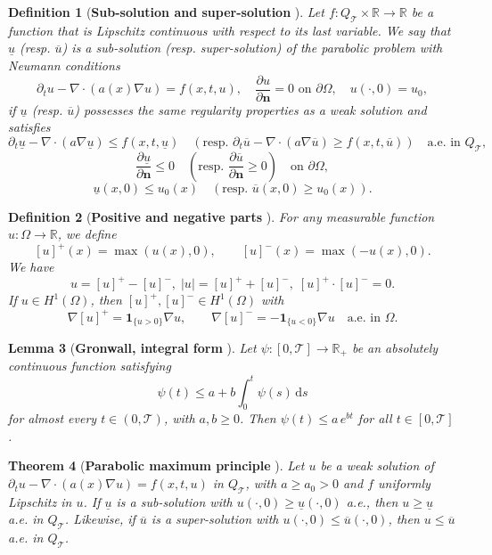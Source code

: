 \documentclass[final,1p,times]{elsarticle}
\numberwithin{equation}{section}
\newtheorem{theorem}{Theorem}[section]
\newtheorem{lemma}[theorem]{Lemma}
\newtheorem{definition}[theorem]{Definition}
\newcommand{\R}{\mathbb{R}}
\newcommand{\QT}{Q_{\mathcal{T}}}
\newcommand{\ds}{\,\mathrm{d}s}
\newcommand{\ppos}[1]{\left[#1\right]^{+}}
\newcommand{\pneg}[1]{\left[#1\right]^{-}}
\newcommand{\ptn}{\partial_t}
\begin{document}
	\begin{definition}[\textbf{Sub-solution and super-solution} \cite{EvansBook2010}]
		Let $f : \QT \times \R \to \R$ be a function that is Lipschitz continuous with respect to its last variable. We say that $\underline{u}$ (resp. $\overline{u}$) is a \emph{sub-solution} (resp. \emph{super-solution}) of the parabolic problem with Neumann conditions
		\[
		\ptn u - \nabla\cdot(a(x)\nabla u) = f(x,t,u), \quad
		\frac{\partial u}{\partial \mathbf{n}} = 0 \text{ on } \partial\Omega,\quad
		u(\cdot,0) = u_0,
		\]
		if $\underline{u}$ (resp. $\overline{u}$) possesses the same regularity properties as a weak solution and satisfies
		\[
		\ptn \underline{u} - \nabla\cdot(a\nabla \underline{u}) \leq f(x,t,\underline{u})
		\quad (\text{resp. } 	\ptn \overline{u} - \nabla\cdot(a\nabla \overline{u}) \geq f(x,t,\overline{u})) \quad \text{a.e. in } \QT,
		\]
		\[
		\frac{\partial \underline{u}}{\partial\mathbf{n}} \leq 0
		\quad \left( \text{resp. } 	\frac{\partial \overline{u}}{\partial\mathbf{n}} \geq 0 \right) \quad \text{on } \partial\Omega,
		\]
		\[
		\underline{u}(x,0) \leq u_0(x)
		\quad (\text{resp. } \overline{u}(x,0) \geq u_0(x)).
		\]
	\end{definition}
	
	\begin{definition}[\textbf{Positive and negative parts} \cite{Ziemer}]
		For any measurable function $u : \Omega \to \R$, we define
		\[
		\ppos{u}(x) = \max(u(x), 0), \qquad \pneg{u}(x) = \max(-u(x), 0).
		\]
		We have $$u = \ppos{u} - \pneg{u}, \; |u| = \ppos{u} + \pneg{u}, \; \ppos{u} \cdot \pneg{u} = 0.$$
		If $u \in H^1(\Omega)$, then $\ppos{u}, \pneg{u} \in H^1(\Omega)$ with
		\[
		\nabla\ppos{u} = \mathbf{1}_{\{u>0\}}\nabla u, \qquad
		\nabla\pneg{u} = -\mathbf{1}_{\{u<0\}}\nabla u
		\quad\text{a.e. in } \Omega.
		\]
	\end{definition}
	
	\begin{lemma}[\textbf{Gronwall, integral form} \cite{EvansBook2010}]
		\label{lem:Gronwall}
		Let $\psi : [0,\mathcal{T}] \to \R_+$ be an absolutely continuous function satisfying
		\[
		\psi(t) \leq a + b\int_0^t \psi(s)\ds
		\]
		for almost every $t \in (0,\mathcal{T})$, with $a, b \geq 0$. Then $\psi(t) \leq a\,e^{bt}$ for all $t \in [0,\mathcal{T}]$.
	\end{lemma}
	
	\begin{theorem}[\textbf{Parabolic maximum principle} \cite{EvansBook2010}]
		\label{thm:max_par}
		Let $u$ be a weak solution of
		$\ptn u - \nabla\cdot(a(x)\nabla u) = f(x,t,u)$
		in $\QT$, with $a \geq a_0 > 0$ and $f$ uniformly Lipschitz in $u$. If $\underline{u}$
		is a sub-solution with $u(\cdot,0) \geq \underline{u}(\cdot,0)$ a.e., then
		$u \geq \underline{u}$ a.e. in $\QT$. Likewise, if $\overline{u}$ is a super-solution with
		$u(\cdot,0) \leq \overline{u}(\cdot,0)$, then $u \leq \overline{u}$ a.e. in $\QT$.
	\end{theorem}
	
\end{document}

